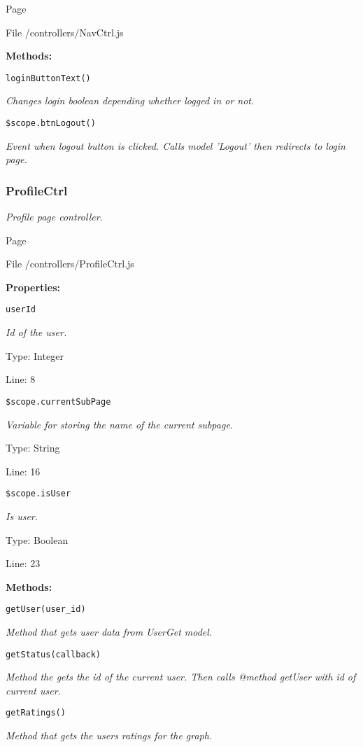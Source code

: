 Page \pageref{NavCtrl.js}

File /controllers/NavCtrl.js

\textbf{Methods:}

\texttt{loginButtonText()}

{\scriptsize
\textit{Changes login boolean depending whether logged in or not.}

}

\texttt{\$scope.btnLogout()}

{\scriptsize
\textit{Event when logout button is clicked.
Calls model 'Logout' then redirects to login page.}

}

\subsubsection{ProfileCtrl}
\textit{Profile page controller.}

Page \pageref{ProfileCtrl.js}

File /controllers/ProfileCtrl.js

\textbf{Properties:}

\texttt{userId}

{\scriptsize
\textit{Id of the user.}

Type: Integer

Line: 8

}
\texttt{\$scope.currentSubPage}

{\scriptsize
\textit{Variable for storing the name of the current subpage.}

Type: String

Line: 16

}
\texttt{\$scope.isUser}

{\scriptsize
\textit{Is user.}

Type: Boolean

Line: 23

}
\textbf{Methods:}

\texttt{getUser(user\_id)}

{\scriptsize
\textit{Method that gets user data from UserGet model.}

}

\texttt{getStatus(callback)}

{\scriptsize
\textit{Method the gets the id of the current user.
Then calls @method getUser with id of current user.}

}

\texttt{getRatings()}

{\scriptsize
\textit{Method that gets the users ratings for the graph.}

}

